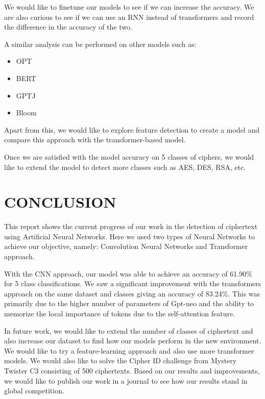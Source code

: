 \documentclass[a4paper]{article}
\begin{document}
We would like to finetune our models to see if we can increase 
the accuracy. We are also curious to see if we can use an RNN 
instead of transformers and record the difference in the accuracy 
of the two.

A similar analysis can be performed on other models such as:
\begin{itemize}
    \item OPT
    \item BERT
    \item GPTJ
    \item Bloom
\end{itemize}

Apart from this, we would like to explore feature detection 
to create a model and compare this approach with the transformer-based 
model.

Once we are satisfied with the model accuracy on 5 classes of 
ciphers, we would like to extend the model to detect more classes 
such as AES, DES, RSA, etc.

\section{CONCLUSION}

This report shows the current progress of our work in the detection of ciphertext using Artificial Neural Networks. Here we used two types of Neural Networks to achieve our objective, namely: Convolution Neural Networks and Transformer approach. 

With the CNN approach, our model was able to achieve an accuracy of 61.90\% for 5 class classifications. We saw a significant improvement with the transformers approach on the same dataset and classes giving an accuracy of 83.24\%. This was primarily due to the higher number of parameters of Gpt-neo and the ability to memorize the local importance of tokens due to the self-attention feature. 

In future work, we would like to extend the number of classes of ciphertext and also increase our dataset to find how our models perform in the new environment. We would like to try a feature-learning approach and also use more transformer models.  We would also like to solve the Cipher ID challenge from Mystery Twister C3  consisting of 500 ciphertexts. Based on our results and improvements, we would like to publish our work in a journal to see how our results stand in global competition. 

\newpage
\renewcommand{\refname}{REFERENCES}


\end{document}
